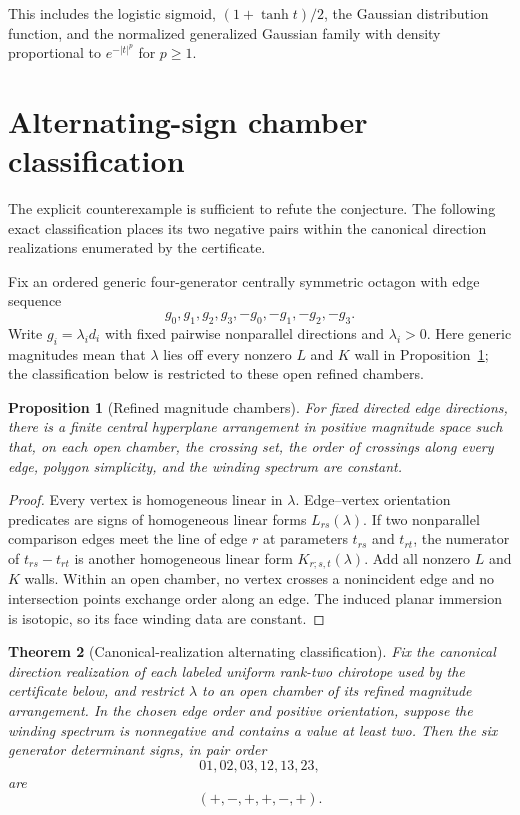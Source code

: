 \documentclass[11pt]{article}
\newtheorem{theorem}{Theorem}[section]
\newtheorem{proposition}[theorem]{Proposition}
\theoremstyle{remark}
\begin{document}
This includes the logistic sigmoid, $(1+\tanh t)/2$, the Gaussian distribution function, and the normalized generalized Gaussian family with density proportional to $e^{-|t|^p}$ for $p\ge1$.

\section{Alternating-sign chamber classification}\label{sec:classification}
The explicit counterexample is sufficient to refute the conjecture. The following exact classification places its two negative pairs within the canonical direction realizations enumerated by the certificate.

Fix an ordered generic four-generator centrally symmetric octagon with edge sequence
\[
 g_0,g_1,g_2,g_3,-g_0,-g_1,-g_2,-g_3.
\]
Write $g_i=\lambda_i d_i$ with fixed pairwise nonparallel directions and $\lambda_i>0$. Here generic magnitudes mean that $\lambda$ lies off every nonzero $L$ and $K$ wall in Proposition~\ref{prop:chambers}; the classification below is restricted to these open refined chambers.

\begin{proposition}[Refined magnitude chambers]\label{prop:chambers}
For fixed directed edge directions, there is a finite central hyperplane arrangement in positive magnitude space such that, on each open chamber, the crossing set, the order of crossings along every edge, polygon simplicity, and the winding spectrum are constant.
\end{proposition}

\begin{proof}
Every vertex is homogeneous linear in $\lambda$. Edge--vertex orientation predicates are signs of homogeneous linear forms $L_{rs}(\lambda)$. If two nonparallel comparison edges meet the line of edge $r$ at parameters $t_{rs}$ and $t_{rt}$, the numerator of $t_{rs}-t_{rt}$ is another homogeneous linear form $K_{r;s,t}(\lambda)$. Add all nonzero $L$ and $K$ walls. Within an open chamber, no vertex crosses a nonincident edge and no intersection points exchange order along an edge. The induced planar immersion is isotopic, so its face winding data are constant.
\end{proof}

\begin{theorem}[Canonical-realization alternating classification]\label{thm:classification}
Fix the canonical direction realization of each labeled uniform rank-two chirotope used by the certificate below, and restrict $\lambda$ to an open chamber of its refined magnitude arrangement. In the chosen edge order and positive orientation, suppose the winding spectrum is nonnegative and contains a value at least two. Then the six generator determinant signs, in pair order
\[
 01,02,03,12,13,23,
\]
are
\[
 (+,-,+,+,-,+).
\]
\end{theorem}
\end{document}
